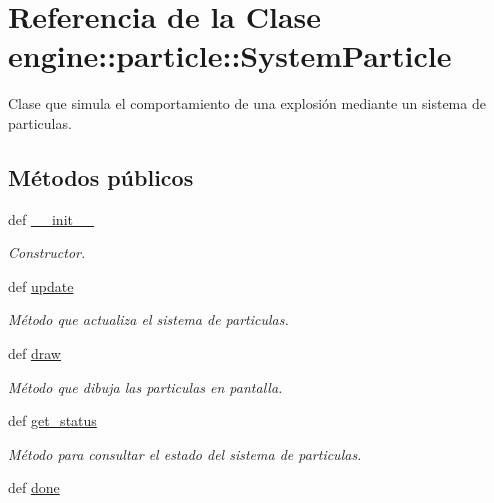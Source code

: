\hypertarget{classengine_1_1particle_1_1SystemParticle}{
\section{\-Referencia de la \-Clase engine\-:\-:particle\-:\-:\-System\-Particle}
\label{classengine_1_1particle_1_1SystemParticle}
}


\-Clase que simula el comportamiento de una explosión mediante un sistema de particulas.  


\subsection*{\-Métodos públicos}
\begin{DoxyCompactItemize}
\item 
def \hyperlink{classengine_1_1particle_1_1SystemParticle_afce8ec0f1f09b32c5ad8f4816d26e180}{\-\_\-\-\_\-init\-\_\-\-\_\-}
\begin{DoxyCompactList}\small\item\em \-Constructor. \end{DoxyCompactList}\item 
\hypertarget{classengine_1_1particle_1_1SystemParticle_a325523b6512d83b18a1f0d6f089b8691}{
def \hyperlink{classengine_1_1particle_1_1SystemParticle_a325523b6512d83b18a1f0d6f089b8691}{update}}
\label{classengine_1_1particle_1_1SystemParticle_a325523b6512d83b18a1f0d6f089b8691}

\begin{DoxyCompactList}\small\item\em \-Método que actualiza el sistema de particulas. \end{DoxyCompactList}\item 
def \hyperlink{classengine_1_1particle_1_1SystemParticle_a8e991d777bc4438d8ce193ad91764bb7}{draw}
\begin{DoxyCompactList}\small\item\em \-Método que dibuja las particulas en pantalla. \end{DoxyCompactList}\item 
def \hyperlink{classengine_1_1particle_1_1SystemParticle_a9150bd2f96973f2aa15751dc6b2bd7ea}{get\-\_\-status}
\begin{DoxyCompactList}\small\item\em \-Método para consultar el estado del sistema de particulas. \end{DoxyCompactList}\item 
\hypertarget{classengine_1_1particle_1_1SystemParticle_a5d12745586040f0749d5b74f70f13efb}{
def \hyperlink{classengine_1_1particle_1_1SystemParticle_a5d12745586040f0749d5b74f70f13efb}{done}}
\label{classengine_1_1particle_1_1SystemParticle_a5d12745586040f0749d5b74f70f13efb}


\end{DoxyCompactItemize}
